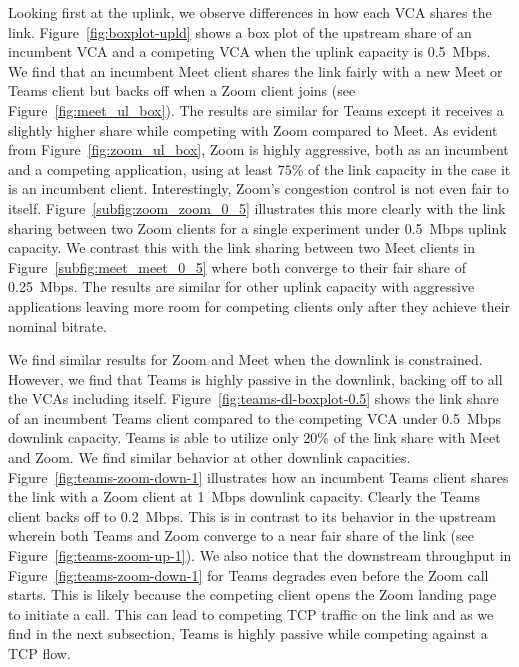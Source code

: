Looking first at the uplink, we observe differences in how each VCA shares the link. Figure~\ref{fig:boxplot-upld} shows a box plot of the upstream share of an incumbent VCA and a competing VCA when the uplink capacity is 0.5~Mbps.  We find that an incumbent Meet client shares the link fairly with a new Meet or Teams client but backs off when a Zoom client joins (see Figure~\ref{fig:meet_ul_box}). The results are similar for Teams except it receives a slightly higher share while competing with Zoom compared to Meet. As evident from Figure~\ref{fig:zoom_ul_box}, Zoom is highly aggressive, both as an incumbent and a competing application, using at least $75\%$ of the link capacity in the case it is an incumbent client. Interestingly, Zoom's congestion control is not even fair to itself. Figure~\ref{subfig:zoom_zoom_0_5} illustrates this more clearly with the link sharing between two Zoom clients for a single experiment under 0.5~Mbps uplink capacity. We contrast this with the link sharing between two Meet clients in Figure~\ref{subfig:meet_meet_0_5} where both converge to their fair share of 0.25~Mbps. The results are similar for other uplink capacity with aggressive applications leaving more room for competing clients only after they achieve their nominal bitrate.  %

We find similar results for Zoom and Meet when the downlink is constrained. However, we find that Teams is highly passive in the downlink, backing off to all the VCAs including itself. Figure~\ref{fig:teams-dl-boxplot-0.5} shows the link share of an incumbent Teams client compared to the competing VCA under 0.5~Mbps downlink capacity. Teams is able to utilize only 20\% of the link share with Meet and Zoom. We find similar behavior at other downlink capacities. Figure~\ref{fig:teams-zoom-down-1} illustrates how an incumbent Teams client shares the link with a Zoom client at 1~Mbps downlink capacity. Clearly the Teams client backs off to 0.2~Mbps. This is in contrast to its behavior in the upstream wherein both Teams and Zoom converge to a near fair share of the link (see Figure~\ref{fig:teams-zoom-up-1}). We also notice that the downstream throughput in Figure~\ref{fig:teams-zoom-down-1} for Teams degrades even before the Zoom call starts. This is likely because the competing client opens the Zoom landing page to initiate a call. This can lead to competing TCP traffic on the link and as we find in the next subsection, Teams is highly passive while competing against a TCP flow. %



